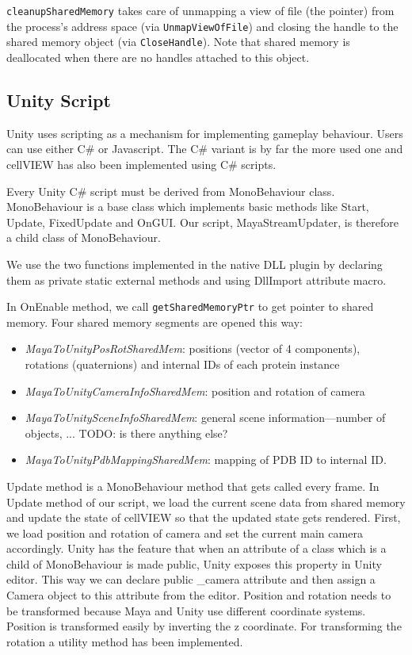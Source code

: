\documentclass[
  digital, %
  table,   %
  nolof,     %
  nolot,     %
]{fithesis3}
\begin{document}
\texttt{cleanupSharedMemory} takes care of unmapping a view of file (the pointer) from the process's address space (via \texttt{UnmapViewOfFile}) and closing the handle to the shared memory object (via \texttt{CloseHandle}). Note that shared memory is deallocated when there are no handles attached to this object.

\subsection{Unity Script}
Unity uses scripting as a mechanism for implementing gameplay behaviour. Users can use either C\# or Javascript. The C\# variant is by far the more used one and cellVIEW has also been implemented using C\# scripts.

Every Unity C\# script must be derived from MonoBehaviour class. MonoBehaviour is a base class which implements basic methods like Start, Update, FixedUpdate and OnGUI. Our script, MayaStreamUpdater, is therefore a child class of MonoBehaviour.

We use the two functions implemented in the native DLL plugin by declaring them as private static external methods and using DllImport attribute macro.

In OnEnable method, we call \texttt{getSharedMemoryPtr} to get pointer to shared memory. Four shared memory segments are opened this way:
\begin{itemize}
\item \textit{MayaToUnityPosRotSharedMem}: positions (vector of 4 components), rotations (quaternions) and internal IDs of each protein instance
\item \textit{MayaToUnityCameraInfoSharedMem}: position and rotation of camera
\item \textit{MayaToUnitySceneInfoSharedMem}: general scene information—number of objects, ... TODO: is there anything else?
\item \textit{MayaToUnityPdbMappingSharedMem}: mapping of PDB ID to internal ID.
\end{itemize}

Update method is a MonoBehaviour method that gets called every frame. In Update method of our script, we load the current scene data from shared memory and update the state of cellVIEW so that the updated state gets rendered. First, we load position and rotation of camera and set the current main camera accordingly. Unity has the feature that when an attribute of a class which is a child of MonoBehaviour is made public, Unity exposes this property in Unity editor. This way we can declare public \_camera attribute and then assign a Camera object to this attribute from the editor. Position and rotation needs to be transformed because Maya and Unity use different coordinate systems. Position is transformed easily by inverting the z coordinate. For transforming the rotation a utility method has been implemented.
\end{document}
